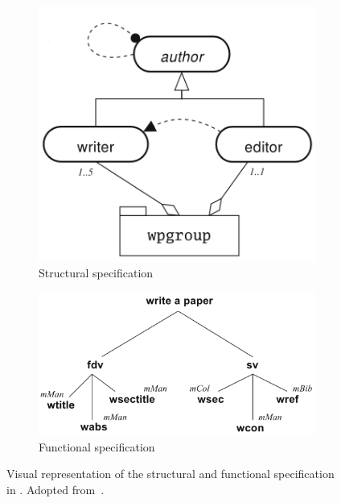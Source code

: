 \begin{figure}[H]
    \begin{subfigure}[h]{0.4\linewidth}
        \includegraphics[width=\textwidth]{images/moise-structural.png}
        \caption{Structural specification}
        \label{fig:moise-structural}
    \end{subfigure}
    \begin{subfigure}[h]{0.6\linewidth}
        \includegraphics[width=\textwidth]{images/moise-functional.png}
        \caption{Functional specification}
        \label{fig:moise-functional}
    \end{subfigure}
    \caption{Visual representation of the structural and functional specification in \moise{}. Adopted from~\cite{hubner2010}.}
    \label{fig:moise-visual}
\end{figure}

